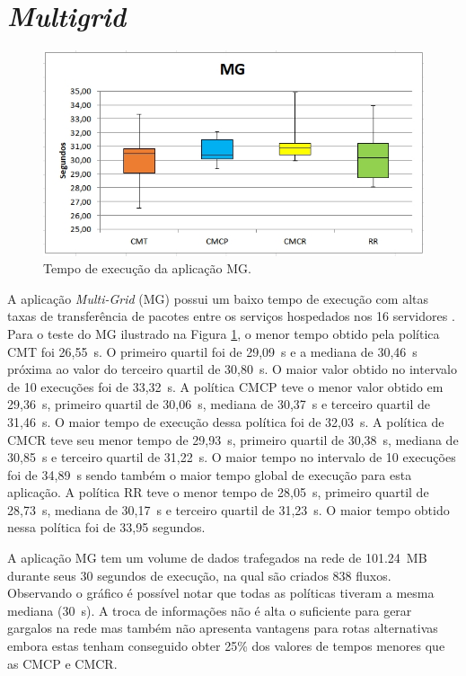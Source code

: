 \section{\textit{Multigrid}}

\label{sec:mg}
\begin{figure}[!htb]
	\caption{\label{fig:mg}Tempo de execução da aplicação MG.}
	\begin{center}
	    \includegraphics[scale=0.60]{imagens/mg.jpg}
	\end{center}
\end{figure}
A aplicação \textit{Multi-Grid} (MG)  possui um baixo tempo de execução com altas taxas de transferência de pacotes entre os serviços hospedados nos 16 servidores \cite{marcondes2016executing}. Para o teste do MG ilustrado na Figura \ref{fig:mg}, o menor tempo obtido pela política CMT foi 26,55~s. O primeiro quartil foi de 29,09~s e a mediana de 30,46~s próxima ao valor do terceiro quartil de 30,80~s. O maior valor obtido no intervalo de 10 execuções foi de 33,32~s. A política CMCP teve o menor valor obtido em 29,36~s, primeiro quartil de 30,06~s, mediana de 30,37~s e terceiro quartil de 31,46~s. O maior tempo de execução dessa política foi de 32,03~s. A política de CMCR teve seu menor tempo de 29,93~s, primeiro quartil de 30,38~s, mediana de 30,85~s e terceiro quartil de 31,22~s. O maior tempo no intervalo de 10 execuções foi de 34,89~s sendo também o maior tempo global de execução para esta aplicação. A política RR teve o menor tempo de 28,05~s, primeiro quartil de 28,73~s, mediana de 30,17~s e terceiro quartil de 31,23~s. O maior tempo obtido nessa política foi de 33,95 segundos. 

A aplicação MG tem um volume de dados trafegados na rede de 101.24~MB durante seus 30 segundos de execução, na qual são criados 838 fluxos. Observando o gráfico é possível notar que todas as políticas tiveram a mesma mediana (30~s). A troca de informações não é alta o suficiente para gerar gargalos na rede mas também não apresenta vantagens para rotas alternativas embora estas tenham conseguido obter 25\% dos valores de tempos menores que as CMCP e CMCR. 

